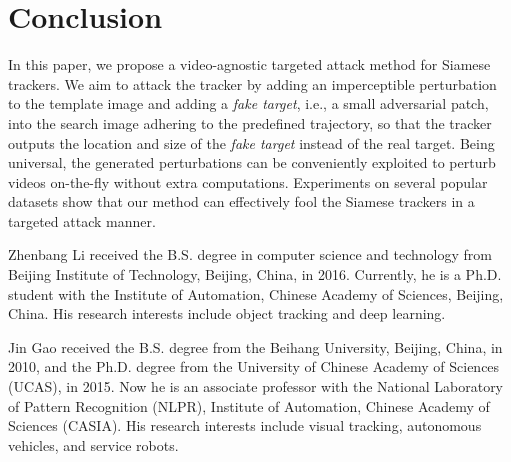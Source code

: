 \documentclass[journal]{IEEEtran}
\newcommand{\ie}{i.e.}
\begin{document}
\section{Conclusion}

In this paper, we propose a video-agnostic targeted attack method for Siamese trackers. 
We aim to attack the tracker by adding an imperceptible perturbation to the template image and adding a \textit{fake target}, \ie, a small adversarial patch, into the search image adhering to the predefined trajectory, so that the tracker outputs the location and size of the \textit{fake target} instead of the real target. Being universal, the generated perturbations can be conveniently exploited to perturb videos on-the-fly without extra computations.
Experiments on several popular datasets show that our method can effectively fool the Siamese trackers in a targeted attack manner.





\begin{IEEEbiography}
{Zhenbang Li}
received the B.S. degree in computer science and technology from Beijing Institute of Technology, Beijing, China, in 2016. Currently, he is a Ph.D. student with the Institute of Automation, Chinese Academy of Sciences, Beijing, China. His research interests include object tracking and deep learning.
\end{IEEEbiography}

\begin{IEEEbiography}
{Jin Gao}
received the B.S. degree from the Beihang University, Beijing, China, in 2010, and the Ph.D. degree from the University of Chinese Academy of Sciences (UCAS), in 2015. Now he is an associate professor with the National Laboratory of Pattern Recognition (NLPR), Institute of Automation, Chinese Academy of Sciences (CASIA). His research interests include visual tracking, autonomous vehicles, and service robots.
\end{IEEEbiography}
\end{document}
